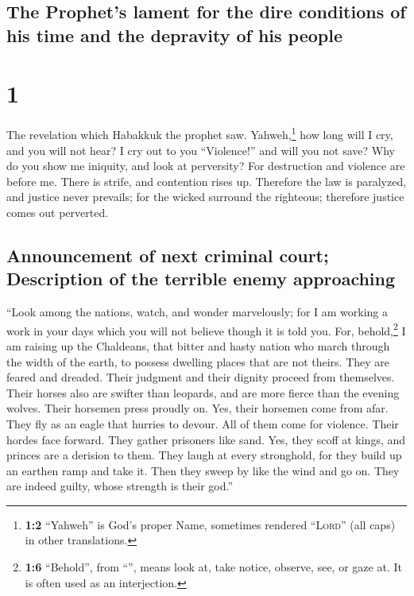 \hypertarget{the-prophets-lament-for-the-dire-conditions-of-his-time-and-the-depravity-of-his-people}{%
\subsection{The Prophet's lament for the dire conditions of his time and
the depravity of his
people}\label{the-prophets-lament-for-the-dire-conditions-of-his-time-and-the-depravity-of-his-people}}

\hypertarget{section}{%
\section{1}\label{section}}

 The revelation which Habakkuk the prophet saw.
 Yahweh,\footnote{\textbf{1:2} ``Yahweh'' is God's proper
  Name, sometimes rendered ``\textsc{Lord}'' (all caps) in other
  translations.} how long will I cry, and you will not hear? I cry out
to you ``Violence!'' and will you not save?  Why do you
show me iniquity, and look at perversity? For destruction and violence
are before me. There is strife, and contention rises up. 
Therefore the law is paralyzed, and justice never prevails; for the
wicked surround the righteous; therefore justice comes out perverted.

\hypertarget{announcement-of-next-criminal-court-description-of-the-terrible-enemy-approaching}{%
\subsection{Announcement of next criminal court; Description of the
terrible enemy
approaching}\label{announcement-of-next-criminal-court-description-of-the-terrible-enemy-approaching}}

 ``Look among the nations, watch, and wonder marvelously;
for I am working a work in your days which you will not believe though
it is told you.  For, behold,\footnote{\textbf{1:6}
  ``Behold'', from ``'', means look at, take notice,
  observe, see, or gaze at. It is often used as an interjection.} I am
raising up the Chaldeans, that bitter and hasty nation who march through
the width of the earth, to possess dwelling places that are not theirs.
 They are feared and dreaded. Their judgment and their
dignity proceed from themselves.  Their horses also are
swifter than leopards, and are more fierce than the evening wolves.
Their horsemen press proudly on. Yes, their horsemen come from afar.
They fly as an eagle that hurries to devour.  All of them
come for violence. Their hordes face forward. They gather prisoners like
sand.  Yes, they scoff at kings, and princes are a
derision to them. They laugh at every stronghold, for they build up an
earthen ramp and take it.  Then they sweep by like the
wind and go on. They are indeed guilty, whose strength is their god.''

